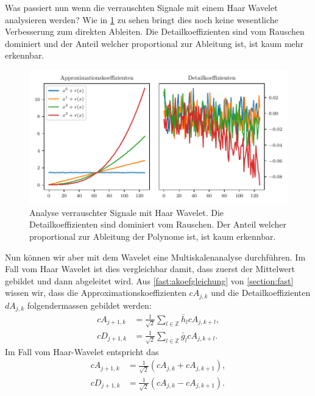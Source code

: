 \begin{refsection}
Was passiert nun wenn die verrauschten Signale mit einem Haar Wavelet
analysieren werden? Wie in \cref{polynomials:noise:db1} zu sehen bringt dies
noch keine wesentliche Verbesserung zum direkten Ableiten. Die
Detailkoeffizienten sind vom Rauschen dominiert und der Anteil welcher
proportional zur Ableitung ist, ist kaum mehr erkennbar.

\begin{figure}
    \centering
    \includegraphics{papers/polynomials/images/polynomials_noise_db1.pdf}
    \caption{Analyse verrauschter Signale mit Haar Wavelet. Die
             Detailkoeffizienten sind dominiert vom Rauschen. Der Anteil
             welcher proportional zur Ableitung der Polynome ist, ist kaum
             erkennbar.\label{polynomials:noise:db1}}
\end{figure}

Nun können wir aber mit dem Wavelet eine Multiskalenanalyse durchführen. Im
Fall vom Haar Wavelet ist dies vergleichbar damit, dass zuerst der Mittelwert
gebildet und dann abgeleitet wird. Aus \cref{fast:akoefgleichung} von
\cref{section:fast} wissen wir, dass die Approximationskoeffizienten $cA_{j,k}$
und die Detailkoeffizienten $dA_{j,k}$ folgendermassen gebildet werden:
\begin{align}
cA_{j+1,k}
&=
\frac{1}{\sqrt{2}} \sum_{l\in\mathbb Z} \bar{h}_l cA_{j,k+l},
\nonumber \\
cD_{j+1,k}
&=
\frac{1}{\sqrt{2}} \sum_{l\in\mathbb Z} \bar{g}_l cA_{j,k+l}.
\end{align}
Im Fall vom Haar-Wavelet entspricht das
\begin{align}
cA_{j+1,k}
&=
\frac{1}{\sqrt{2}} (cA_{j,k} + cA_{j,k+1}),
\nonumber \\
cD_{j+1,k}
&=
\frac{1}{\sqrt{2}} (cA_{j,k} - cA_{j,k+1}).
\end{align}


\end{refsection}
